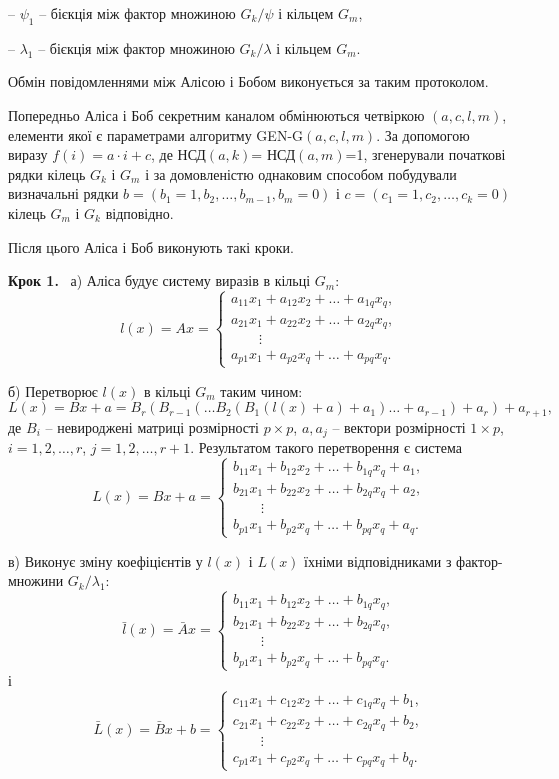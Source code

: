 \documentclass{ceurart}
\begin{document}
-- \(\psi_1\) -- бієкція між фактор множиною \(G_k/\psi\) і кільцем \(G_m\),

-- \(\lambda_1\) -- бієкція між фактор множиною \(G_k/\lambda\) і кільцем \(G_m\).

Обмін повідомленнями між Алісою і Бобом виконується за таким
протоколом.

Попередньо Аліса і Боб секретним каналом обмінюються четвіркою
\((a,c,l,m)\), елементи якої є параметрами алгоритму GEN-G\((a,c,l,m)\).
За допомогою виразу \(f(i) = a\cdot i + c\), де НСД\((a,k)\)=
НСД\((a,m)\)=1, згенерували початкові рядки кілець \(G_k\) і \(G_m\) і
за домовленістю
однаковим способом побудували визначальні рядки \(b=(b_1=1, b_2,
\ldots,b_{m-1},b_m=0)\) і \(c=(c_1=1,c_2,\ldots,c_k=0)\) кілець \(G_m\)
і \(G_k\) відповідно.

Після цього Аліса і Боб виконують такі кроки.

\textbf{Крок 1.} \ а) Аліса будує систему виразів в кільці \(G_m\):
\[
l(x)= Ax = \begin{cases}
  a_{11}x_1+ a_{12}x_2 +\ldots + a_{1q}x_q, \\
  a_{21}x_1+ a_{22}x_2 +\ldots + a_{2q}x_q, \\
  \qquad \vdots \\
  a_{p1}x_1+ a_{p2}x_q +\ldots + a_{pq}x_q.
\end{cases}
\]

б) Перетворює \(l(x)\) в кільці \(G_m\) таким чином:
\[
  L(x) = Bx+a = B_r(B_{r-1}(\ldots B_2(B_1(l(x)+a)+a_1)\ldots +
a_{r-1})+a_r)+a_{r+1},
\]
де \(B_i\) -- невироджені матриці розмірності \(p\times p\), \(a, a_j\)
-- вектори розмірності \(1\times p\), \(i=1,2,\ldots,r\), \(j=1,2,\ldots, r+1\). Результатом такого перетворення є система
\[
L(x)= Bx+a = \begin{cases}
  b_{11}x_1+ b_{12}x_2 +\ldots + b_{1q}x_q + a_1, \\
  b_{21}x_1+ b_{22}x_2 +\ldots + b_{2q}x_q + a_2, \\
  \qquad \vdots \\
  b_{p1}x_1+ b_{p2}x_q +\ldots + b_{pq}x_q + a_q.
\end{cases}
\]

в) Виконує зміну коефіцієнтів у \(l(x)\) і \(L(x)\)
  їхніми відповідниками з фактор-множини \(G_k/\lambda_1\):
\[
\bar l(x)= \bar Ax = \begin{cases}
  b_{11}x_1+ b_{12}x_2 +\ldots + b_{1q}x_q, \\
  b_{21}x_1+ b_{22}x_2 +\ldots + b_{2q}x_q, \\
  \qquad \vdots \\
  b_{p1}x_1+ b_{p2}x_q +\ldots + b_{pq}x_q. %
\end{cases}
\]
і
\[
\bar L(x)= \bar Bx+b = \begin{cases}
  c_{11}x_1+ c_{12}x_2 +\ldots + c_{1q}x_q + b_1, \\
  c_{21}x_1+ c_{22}x_2 +\ldots + c_{2q}x_q + b_2, \\
  \qquad \vdots \\
  c_{p1}x_1+ c_{p2}x_q +\ldots + c_{pq}x_q + b_q.
\end{cases}
\]
\end{document}
